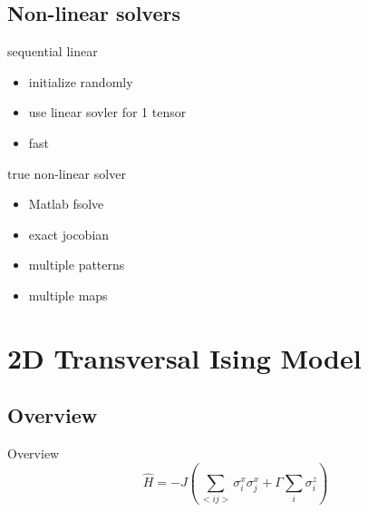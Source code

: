 \documentclass[aspectratio=169]{beamer}
\begin{document}
\subsection{Non-linear solvers}
\begin{frame}{sequential linear}
    \begin{itemize}
        \item initialize randomly
        \item use linear sovler for 1 tensor
        \item fast
    \end{itemize}
\end{frame}


\begin{frame}{true non-linear solver}
    \begin{itemize}
        \item Matlab fsolve
        \item exact jocobian
        \item multiple patterns
        \item multiple maps
    \end{itemize}
\end{frame}


\section{2D Transversal Ising Model}


\subsection{Overview}
\begin{frame}{Overview}
    \begin{equation}
        \hat{H} = -J \left (  \sum_{<i j>} \sigma^x_i \sigma^x_j + \Gamma \sum_i \sigma^z_i \right )
    \end{equation}
\end{frame}
\end{document}
